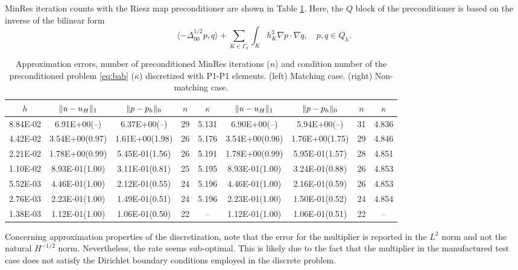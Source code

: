 \documentclass[r]{siamart171218}
\begin{document}
MinRes iteration counts with the Riesz map preconditioner are shown in
Table \ref{tab:p1_p1}. Here, the $Q$ block of the preconditioner is based
on the inverse of the bilinear form
\[
\langle -\Delta_{00}^{1/2} p, q\rangle + \sum_{K\in\Gamma_h}\int_{K} h_K^3\nabla p \cdot\nabla q,\quad p, q\in Q_h.
\]
%

\begin{table}
  \begin{center}
    \footnotesize{
  \begin{tabular}{c|cc|c|c||cc|c|c}
    \hline
    $h$ & $\lVert{u-u_H}\rVert_1$ & $\lVert{p-p_h}\rVert_0$ & $n$ & $\kappa$
        & $\lVert{u-u_H}\rVert_1$ & $\lVert{p-p_h}\rVert_0$ & $n$ & $\kappa$ \\
    \hline
8.84E-02 & 6.91E+00(--)   & 6.37E+00(--)   & 29 & 5.131 & 6.90E+00(--)  & 5.94E+00(--)    & 31 & 4.836\\
4.42E-02 & 3.54E+00(0.97) & 1.61E+00(1.98) & 26 & 5.176 & 3.54E+00(0.96) & 1.76E+00(1.75) & 29 & 4.846\\
2.21E-02 & 1.78E+00(0.99) & 5.45E-01(1.56) & 26 & 5.191 & 1.78E+00(0.99) & 5.95E-01(1.57) & 28 & 4.851\\
1.10E-02 & 8.93E-01(1.00) & 3.11E-01(0.81) & 25 & 5.195 & 8.93E-01(1.00) & 3.24E-01(0.88) & 26 & 4.853\\
5.52E-03 & 4.46E-01(1.00) & 2.12E-01(0.55) & 24 & 5.196 & 4.46E-01(1.00) & 2.16E-01(0.59) & 26 & 4.853\\
2.76E-03 & 2.23E-01(1.00) & 1.49E-01(0.51) & 24 & 5.196 & 2.23E-01(1.00) & 1.50E-01(0.52) & 24 & 4.854\\
1.38E-03 & 1.12E-01(1.00) & 1.06E-01(0.50) & 22 & --    & 1.12E-01(1.00) & 1.06E-01(0.51) & 22 & --   \\
    \hline
  \end{tabular}
  }
    \caption{Approximation errors, number of preconditioned MinRes iterations ($n$) and
      condition number of the preconditioned problem \eqref{eq:bab} ($\kappa$) discretized
      with P1-P1 elements. (left) Matching case. (right) Non-matching case.}
  \label{tab:p1_p1}
  \end{center}
\end{table}
%
Concerning approximation properties of the discretization, note that the error
for the multiplier is reported in the $L^2$ norm and not the natural $H^{-1/2}$
norm. Nevertheless, the rate seems sub-optimal. This is likely due to the fact
that the multiplier in the manufactured test case does not satisfy the
Dirichlet boundary conditions employed in the discrete problem.
\end{document}
